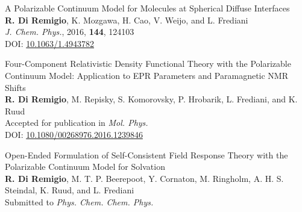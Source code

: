 {\Large
\noindent\textsf{A Polarizable Continuum Model for Molecules at Spherical
Diffuse Interfaces
}
\\
    \textbf{R. Di Remigio}, K. Mozgawa, H. Cao, V. Weijo, and L.
    Frediani
\\
    \textit{J. Chem. Phys.}, \textrm{2016}, \textbf{144}, 124103
  \\
  DOI: \url{10.1063/1.4943782}
}
\vspace*{\fill}



\thispagestyle{empty}
\vspace*{\fill}
\begin{flushright}
{\Huge{}}
\end{flushright}

{\Large
\noindent\textsf{Four-Component Relativistic Density Functional Theory with the
Polarizable Continuum Model: Application to EPR Parameters
and Paramagnetic NMR Shifts
}
\\
  \textbf{R. Di Remigio}, M. Repisky, S. Komorovsky, P. Hrobarik, L.
  Frediani, and K. Ruud
\\
  Accepted for publication in \textit{Mol. Phys.}
  \\
  DOI: \url{10.1080/00268976.2016.1239846}
}
\vspace*{\fill}



\thispagestyle{empty}
\vspace*{\fill}
\begin{flushright}
{\Huge{}}
\end{flushright}

{\Large
\noindent\textsf{Open-Ended Formulation of Self-Consistent Field Response Theory with
the Polarizable Continuum Model for Solvation
}
\\
    \textbf{R. Di Remigio}, M. T. P. Beerepoot, Y. Cornaton, M. Ringholm,
    A. H. S. Steindal, K. Ruud, and L. Frediani
\\
    Submitted to \textit{Phys. Chem. Chem. Phys.}
}
\vspace*{\fill}


